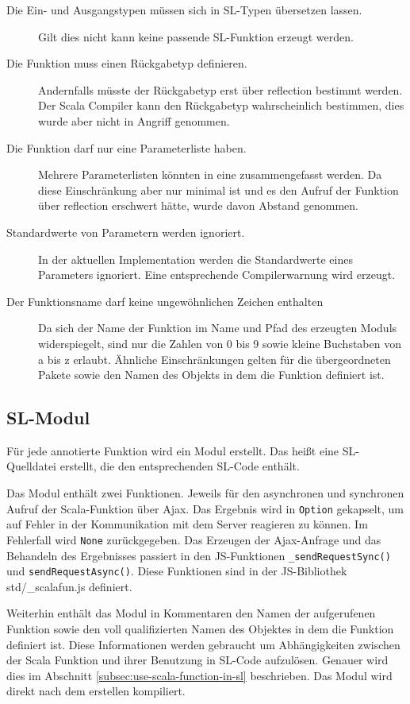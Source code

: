 \documentclass[12pt,bibtotoc]{scrreprt}
\begin{document}
\begin{description}
 \item[Die Ein- und Ausgangstypen müssen sich in SL-Typen übersetzen lassen.]{Gilt dies nicht kann keine passende SL-Funktion erzeugt werden.}
 \item[Die Funktion muss einen Rückgabetyp definieren.]{Andernfalls müsste der Rückgabetyp erst über reflection bestimmt werden. Der Scala Compiler kann den Rückgabetyp wahrscheinlich bestimmen, dies wurde aber nicht in Angriff genommen.}
 \item[Die Funktion darf nur eine Parameterliste haben.]{Mehrere Parameterlisten könnten in eine zusammengefasst werden. Da diese Einschränkung aber nur minimal ist und es den Aufruf der Funktion über reflection erschwert hätte, wurde davon Abstand genommen.}
 \item[Standardwerte von Parametern werden ignoriert.]{In der aktuellen Implementation werden die Standardwerte eines Parameters ignoriert. Eine entsprechende Compilerwarnung wird erzeugt.}
 \item[Der Funktionsname darf keine ungewöhnlichen Zeichen enthalten]{Da sich der Name der Funktion im Name und Pfad des erzeugten Moduls widerspiegelt, sind nur die Zahlen von 0 bis 9 sowie kleine Buchstaben von a bis z erlaubt. Ähnliche Einschränkungen gelten für die übergeordneten Pakete sowie den Namen des Objekts in dem die Funktion definiert ist.}
\end{description}

\subsection{SL-Modul}
\label{subsec:sl-modul}

Für jede annotierte Funktion wird ein Modul erstellt. Das heißt eine SL-Quelldatei erstellt, die den entsprechenden SL-Code enthält.

Das Modul enthält zwei Funktionen. Jeweils für den asynchronen und synchronen Aufruf der Scala-Funktion über Ajax. Das Ergebnis wird in \lstinline!Option! gekapselt, um auf Fehler in der Kommunikation mit dem Server reagieren zu können. Im Fehlerfall wird \lstinline!None! zurückgegeben. Das Erzeugen der Ajax-Anfrage und das Behandeln des Ergebnisses passiert in den \ac{JS}-Funktionen \lstinline!_sendRequestSync()! und \lstinline!sendRequestAsync()!. Diese Funktionen sind in der \ac{JS}-Bibliothek std/\_scalafun.js definiert. 

Weiterhin enthält das Modul in Kommentaren den Namen der aufgerufenen Funktion sowie den voll qualifizierten Namen des Objektes in dem die Funktion definiert ist. Diese Informationen werden gebraucht um Abhängigkeiten zwischen der Scala Funktion und ihrer Benutzung in \ac{SL}-Code aufzulösen. Genauer wird dies im Abschnitt \ref{subsec:use-scala-function-in-sl} beschrieben. Das Modul wird direkt nach dem erstellen kompiliert.
\end{document}
